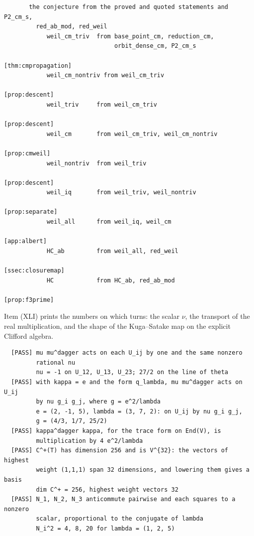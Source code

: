 \begin{small}
\begin{verbatim}
       the conjecture from the proved and quoted statements and P2_cm_s,
         red_ab_mod, red_weil
            weil_cm_triv  from base_point_cm, reduction_cm,
                               orbit_dense_cm, P2_cm_s
                                                       [thm:cmpropagation]
            weil_cm_nontriv from weil_cm_triv
                                                            [prop:descent]
            weil_triv     from weil_cm_triv
                                                            [prop:descent]
            weil_cm       from weil_cm_triv, weil_cm_nontriv
                                                             [prop:cmweil]
            weil_nontriv  from weil_triv
                                                            [prop:descent]
            weil_iq       from weil_triv, weil_nontriv
                                                           [prop:separate]
            weil_all      from weil_iq, weil_cm
                                                              [app:albert]
            HC_ab         from weil_all, red_weil
                                                         [ssec:closuremap]
            HC            from HC_ab, red_ab_mod
                                                            [prop:f3prime]
\end{verbatim}
\end{small}

Item (XLI) prints the numbers on which  turns: the
scalar $\nu$, the transport of the real multiplication, and the shape of the
Kuga--Satake map on the explicit Clifford algebra.

\begin{small}
\begin{verbatim}
  [PASS] mu mu^dagger acts on each U_ij by one and the same nonzero
         rational nu
         nu = -1 on U_12, U_13, U_23; 27/2 on the line of theta
  [PASS] with kappa = e and the form q_lambda, mu mu^dagger acts on U_ij
         by nu g_i g_j, where g = e^2/lambda
         e = (2, -1, 5), lambda = (3, 7, 2): on U_ij by nu g_i g_j,
         g = (4/3, 1/7, 25/2)
  [PASS] kappa^dagger kappa, for the trace form on End(V), is
         multiplication by 4 e^2/lambda
  [PASS] C^+(T) has dimension 256 and is V^{32}: the vectors of highest
         weight (1,1,1) span 32 dimensions, and lowering them gives a basis
         dim C^+ = 256, highest weight vectors 32
  [PASS] N_1, N_2, N_3 anticommute pairwise and each squares to a nonzero
         scalar, proportional to the conjugate of lambda
         N_i^2 = 4, 8, 20 for lambda = (1, 2, 5)
\end{verbatim}
\end{small}

